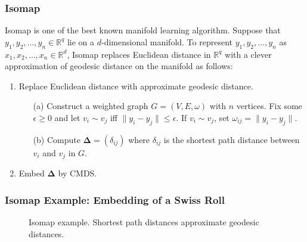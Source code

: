 \documentclass[professionalfonts,hyperref={pdfpagelabels=false,colorlinks=true,linkcolor=red}]{beamer}
\begin{document}
\begin{frame}
  \frametitle{Isomap} 
  Isomap \cite{tenebaum00:_global_geomet_framew_nonlin_dimen_reduc} is
  one of the best known manifold learning algorithm. Suppose that
  $y_1, y_2, \dots, y_n \in \mathbb{R}^{q}$ lie on a $d$-dimensional
  manifold. To represent $y_1, y_2, \dots, y_n$ as $x_1, x_2,
  \dots, x_n \in \mathbb{R}^{d}$, Isomap replaces Euclidean distance
  in $\mathbb{R}^{q}$ with a clever approximation of geodesic distance
  on the manifold as follows: 
  \begin{enumerate}
  \item Replace Euclidean distance with approximate geodesic
    distance.
    \begin{enumerate}
    \item[(a)] Construct a weighted graph $G = (V,E,\omega)$ with $n$
      vertices. Fix some $\epsilon \geq 0$ and let $v_i \sim v_j$ iff
      $\|y_i - y_j\| \leq \epsilon$. If $v_i \sim v_j$, set
      $\omega_{ij} = \|y_i - y_j\|$.
    \item[(b)] Compute $\bm{\Delta} = (\delta_{ij})$ where
      $\delta_{ij}$ is the shortest path distance between $v_i$ and
      $v_j$ in $G$.
    \end{enumerate}
   \item Embed $\bm{\Delta}$ by CMDS.
  \end{enumerate}

\end{frame}
\begin{frame}[label=isomap_example]
  \frametitle{Isomap Example: Embedding of a Swiss Roll}
  \subfiglabelskip=0pt
  \begin{figure}[htbp]
    \label{fig:swissroll}
    \centering
    \hspace{3pt}
    \caption{Isomap example. Shortest path distances approximate
      geodesic distances.}
  \end{figure}
\end{frame}
\end{document}
